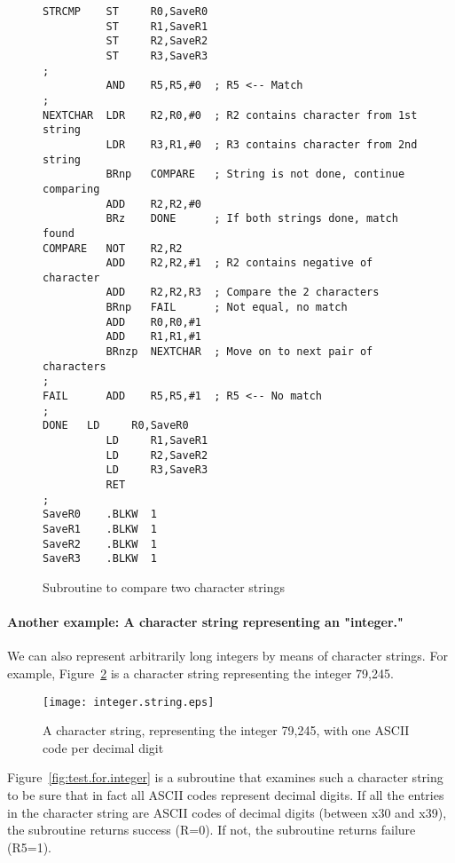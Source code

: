 \documentclass{patt}
\begin{document}
\begin{figure}[h!]
\begin{minipage}{36pc}
\begin{Verbatim}[fontsize=\fontsize{9}{11}\selectfont]
STRCMP    ST     R0,SaveR0
          ST     R1,SaveR1
          ST     R2,SaveR2
          ST     R3,SaveR3
;
          AND    R5,R5,#0  ; R5 <-- Match
;
NEXTCHAR  LDR    R2,R0,#0  ; R2 contains character from 1st string
          LDR    R3,R1,#0  ; R3 contains character from 2nd string
          BRnp   COMPARE   ; String is not done, continue comparing
          ADD    R2,R2,#0
          BRz    DONE      ; If both strings done, match found
COMPARE   NOT    R2,R2
          ADD    R2,R2,#1  ; R2 contains negative of character
          ADD    R2,R2,R3  ; Compare the 2 characters
          BRnp   FAIL      ; Not equal, no match
          ADD    R0,R0,#1
          ADD    R1,R1,#1
          BRnzp  NEXTCHAR  ; Move on to next pair of characters
;
FAIL      ADD    R5,R5,#1  ; R5 <-- No match
;
DONE   LD     R0,SaveR0
          LD     R1,SaveR1
          LD     R2,SaveR2
          LD     R3,SaveR3
          RET
;
SaveR0    .BLKW  1
SaveR1    .BLKW  1
SaveR2    .BLKW  1
SaveR3    .BLKW  1
\end{Verbatim}
\caption{Subroutine to compare two character strings}
\label{fig:string.compare}
\end{minipage}
\end{figure}

\FloatBarrier
\paragraph{Another example: A character string representing an "integer."} 
We can also represent arbitrarily long integers by means of character 
strings.  For example, Figure~\ref{fig:integer.string} is a character string 
representing the integer 79,245.  

\begin{figure}[h]
\centerline{\texttt{[image: integer.string.eps]}}
\caption{A character string, representing the integer 79,245, with one 
ASCII code per decimal digit}
\label{fig:integer.string}
\end{figure}

\FloatBarrier
Figure~\ref{fig:test.for.integer} is a subroutine that examines such a 
character string to be sure that in fact all ASCII codes represent decimal 
digits.  If all the entries in the character string are ASCII codes of 
decimal digits (between x30 and x39), the subroutine returns success (R=0).  
If not, the subroutine returns failure (R5=1).
\end{document}
